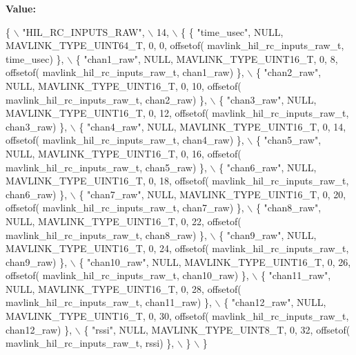 {\bfseries Value\+:}
\begin{DoxyCode}
\{ \(\backslash\)
    \textcolor{stringliteral}{"HIL\_RC\_INPUTS\_RAW"}, \(\backslash\)
    14, \(\backslash\)
    \{  \{ \textcolor{stringliteral}{"time\_usec"}, NULL, MAVLINK_TYPE_UINT64_T, 0, 0, offsetof(
      mavlink_hil_rc_inputs_raw_t, time\_usec) \}, \(\backslash\)
         \{ \textcolor{stringliteral}{"chan1\_raw"}, NULL, MAVLINK_TYPE_UINT16_T, 0, 8, offsetof(
      mavlink_hil_rc_inputs_raw_t, chan1\_raw) \}, \(\backslash\)
         \{ \textcolor{stringliteral}{"chan2\_raw"}, NULL, MAVLINK_TYPE_UINT16_T, 0, 10, offsetof(
      mavlink_hil_rc_inputs_raw_t, chan2\_raw) \}, \(\backslash\)
         \{ \textcolor{stringliteral}{"chan3\_raw"}, NULL, MAVLINK_TYPE_UINT16_T, 0, 12, offsetof(
      mavlink_hil_rc_inputs_raw_t, chan3\_raw) \}, \(\backslash\)
         \{ \textcolor{stringliteral}{"chan4\_raw"}, NULL, MAVLINK_TYPE_UINT16_T, 0, 14, offsetof(
      mavlink_hil_rc_inputs_raw_t, chan4\_raw) \}, \(\backslash\)
         \{ \textcolor{stringliteral}{"chan5\_raw"}, NULL, MAVLINK_TYPE_UINT16_T, 0, 16, offsetof(
      mavlink_hil_rc_inputs_raw_t, chan5\_raw) \}, \(\backslash\)
         \{ \textcolor{stringliteral}{"chan6\_raw"}, NULL, MAVLINK_TYPE_UINT16_T, 0, 18, offsetof(
      mavlink_hil_rc_inputs_raw_t, chan6\_raw) \}, \(\backslash\)
         \{ \textcolor{stringliteral}{"chan7\_raw"}, NULL, MAVLINK_TYPE_UINT16_T, 0, 20, offsetof(
      mavlink_hil_rc_inputs_raw_t, chan7\_raw) \}, \(\backslash\)
         \{ \textcolor{stringliteral}{"chan8\_raw"}, NULL, MAVLINK_TYPE_UINT16_T, 0, 22, offsetof(
      mavlink_hil_rc_inputs_raw_t, chan8\_raw) \}, \(\backslash\)
         \{ \textcolor{stringliteral}{"chan9\_raw"}, NULL, MAVLINK_TYPE_UINT16_T, 0, 24, offsetof(
      mavlink_hil_rc_inputs_raw_t, chan9\_raw) \}, \(\backslash\)
         \{ \textcolor{stringliteral}{"chan10\_raw"}, NULL, MAVLINK_TYPE_UINT16_T, 0, 26, offsetof(
      mavlink_hil_rc_inputs_raw_t, chan10\_raw) \}, \(\backslash\)
         \{ \textcolor{stringliteral}{"chan11\_raw"}, NULL, MAVLINK_TYPE_UINT16_T, 0, 28, offsetof(
      mavlink_hil_rc_inputs_raw_t, chan11\_raw) \}, \(\backslash\)
         \{ \textcolor{stringliteral}{"chan12\_raw"}, NULL, MAVLINK_TYPE_UINT16_T, 0, 30, offsetof(
      mavlink_hil_rc_inputs_raw_t, chan12\_raw) \}, \(\backslash\)
         \{ \textcolor{stringliteral}{"rssi"}, NULL, MAVLINK_TYPE_UINT8_T, 0, 32, offsetof(
      mavlink_hil_rc_inputs_raw_t, rssi) \}, \(\backslash\)
         \} \(\backslash\)
\}
\end{DoxyCode}
\mbox{\label{mavlink__msg__hil__rc__inputs__raw_8h_a8c01a277c3659e356a2128a3a2d5b025}} 
